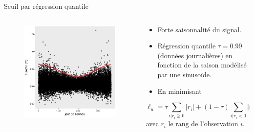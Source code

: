 \documentclass[aspectratio=169]{beamer}
\begin{document}
\begin{frame}{Seuil par régression quantile}
\begin{columns}
	\begin{column}{0.4\textwidth}
		\begin{figure}
		\vspace{-0.4cm}
	 		\includegraphics[height=0.875\textheight, center]{../figures/points.pdf}
		\end{figure}
	\end{column}
	\begin{column}{0.6\textwidth}
	\begin{itemize}
	\setlength{\itemsep}{10pt}
	\item Forte saisonnalité du signal.
	\item Régression quantile $\tau = 0.99$ (données journalières) en fonction de la saison modélisé par une sinusoïde.
	\item En minimisant
	\end{itemize}
	\begin{equation*}
	\ell_u = \tau \sum_{i|r_i \geq 0} |r_i| + (1-\tau) \sum_{i|r_i < 0} |r_i|
	\end{equation*}
	\phantom{-----.} avec $r_i$ le rang de l'observation $i$. %
	\end{column}
\end{columns}
\end{frame}
\end{document}
